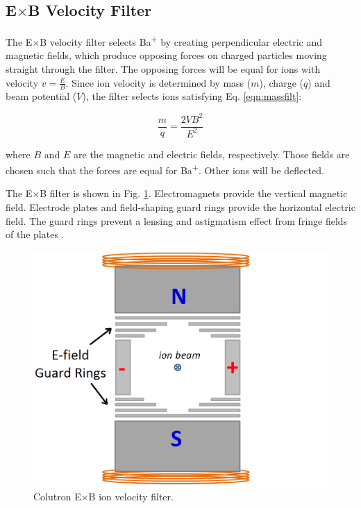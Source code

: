 \subsection{E$\times$B Velocity Filter}

The E$\times$B velocity filter selects Ba\textsuperscript{+} by creating perpendicular electric and magnetic fields, which produce opposing forces on charged particles moving straight through the filter.  The opposing forces will be equal for ions with velocity $v = \frac{E}{B}$.  Since ion velocity is determined by mass ($m$), charge ($q$) and beam potential ($V$), the filter selects ions satisfying Eq. \ref{eqn:massfilt}:

\begin{equation}
\frac{m}{q} = \frac{2 V B^{2}}{E^{2}}
\label{eqn:massfilt}
\end{equation}

\noindent
where $B$ and $E$ are the magnetic and electric fields, respectively.  Those fields are chosen such that the forces are equal for Ba\textsuperscript{+}.  Other ions will be deflected.  

The E$\times$B filter is shown in Fig. \ref{fig:exb}.  Electromagnets provide the vertical magnetic field.  Electrode plates and field-shaping guard rings provide the horizontal electric field.  The guard rings prevent a lensing and astigmatism effect from fringe fields of the plates \cite{Colutron}.

\begin{figure}[h]
        \centering
                \includegraphics[width=.7\textwidth]{figures/ExB.png}
                \caption{Colutron E$\times$B ion velocity filter.}
\label{fig:exb}
\end{figure}



